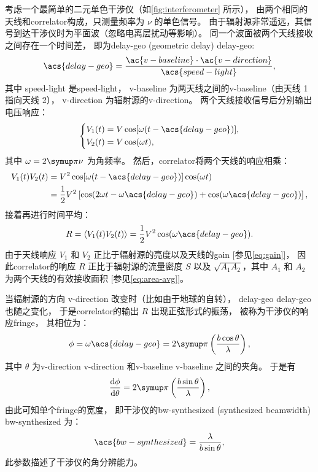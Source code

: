 考虑一个最简单的二元单色干涉仪（如\autoref{fig:interferometer} 所示），
由两个相同的天线和\ac{correlator}构成，只测量频率为 $\nu$ 的单色信号。
由于辐射源非常遥远，其信号到达干涉仪时为平面波（忽略电离层扰动等影响）。
同一个波面被两个天线接收之间存在一个时间差，
即为\acl{delay-geo} (geometric delay) \ac{delay-geo}:
\begin{equation}
  \acs{delay-geo} =
    \frac{\ac{v-baseline} \cdot \ac{v-direction}}{\acs{speed-light}} ,
\end{equation}
其中 \acs{speed-light} 是\acl{speed-light}，
\ac{v-baseline} 为两天线之间的\acl{v-baseline}（由天线 1 指向天线 2），
\ac{v-direction} 为辐射源的\acl{v-direction}。
两个天线接收信号后分别输出电压响应：
\begin{equation}
  \left\{
    \begin{aligned}
      V_1(t) &= V \cos [\omega (t - \acs{delay-geo})] , \\
      V_2(t) &= V \cos (\omega t) ,
    \end{aligned}
  \right.
\end{equation}
其中 $\omega = 2\Cpi\nu$ 为角频率。
然后，\ac{correlator}将两个天线的响应相乘：
\begin{align}
  V_1(t) V_2(t)
    &= V^2 \cos [\omega (t - \acs{delay-geo})] \cos (\omega t) \\
    &= \frac{1}{2} V^2 \left[ \cos (2\omega t - \omega \acs{delay-geo})
      + \cos (\omega \acs{delay-geo}) \right] ,
\end{align}
接着再进行时间平均：
\begin{equation}
  \label{eq:resp-corr}
  R = \langle V_1(t) V_2(t) \rangle
    = \frac{1}{2} V^2 \cos (\omega \acs{delay-geo}) .
\end{equation}
由于天线响应 $V_1$ 和 $V_2$ 正比于辐射源的亮度以及天线的\ac{gain}
[参见\autoref{eq:gain}]，
因此\ac{correlator}的响应 $R$ 正比于辐射源的流量密度 $S$
以及 $\sqrt{A_1 A_2}$，其中 $A_1$ 和 $A_2$ 为两个天线的有效接收面积
[参见\autoref{eq:area-avg}]。

当辐射源的方向 \ac{v-direction} 改变时（比如由于地球的自转），
\acl{delay-geo} \acs{delay-geo} 也随之变化，
于是\ac{correlator}的输出 $R$ 出现正弦形式的振荡，
被称为干涉仪的响应\acf{fringe}，
其相位为：
\begin{equation}
  \phi = \omega \acs{delay-geo}
    = 2\Cpi \left( \frac{b \cos\theta}{\lambda} \right) ,
\end{equation}
其中 $\theta$ 为\acl{v-direction} \ac{v-direction}
和\acl{v-baseline} \ac{v-baseline} 之间的夹角。
于是有
\begin{equation}
  \diff{\phi}{\theta}
    = 2\Cpi \left( \frac{b \sin\theta}{\lambda} \right) ,
\end{equation}
由此可知单个\ac{fringe}的宽度，
即干涉仪的\acl{bw-synthesized} (synthesized beamwidth)
\acs{bw-synthesized} 为：
\begin{equation}
  \label{eq:bw-synthesized}
  \acs{bw-synthesized} = \frac{\lambda}{b \sin\theta} ,
\end{equation}
此参数描述了干涉仪的角分辨能力。

